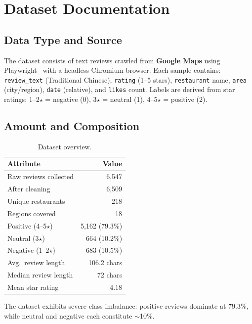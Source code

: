 \documentclass[12pt]{article}
\begin{document}
\section{Dataset Documentation}

\subsection{Data Type and Source}

The dataset consists of text reviews crawled from \textbf{Google Maps} using Playwright~\citep{playwright} with a headless Chromium browser.
Each sample contains: \texttt{review\_text} (Traditional Chinese), \texttt{rating} (1--5 stars), \texttt{restaurant} name, \texttt{area} (city/region), \texttt{date} (relative), and \texttt{likes} count.
Labels are derived from star ratings: 1--2$\star$ = negative (0), 3$\star$ = neutral (1), 4--5$\star$ = positive (2).

\subsection{Amount and Composition}

\begin{table}[H]
\centering
\caption{Dataset overview.}
\label{tab:dataset}
\begin{tabular}{lr}
\toprule
\textbf{Attribute} & \textbf{Value} \\
\midrule
Raw reviews collected & 6{,}547 \\
After cleaning & 6{,}509 \\
Unique restaurants & 218 \\
Regions covered & 18 \\
Positive (4--5$\star$) & 5{,}162 (79.3\%) \\
Neutral (3$\star$) & 664 (10.2\%) \\
Negative (1--2$\star$) & 683 (10.5\%) \\
Avg.\ review length & 106.2 chars \\
Median review length & 72 chars \\
Mean star rating & 4.18 \\
\bottomrule
\end{tabular}
\end{table}

The dataset exhibits severe class imbalance: positive reviews dominate at 79.3\%, while neutral and negative each constitute $\sim$10\%.
\end{document}
